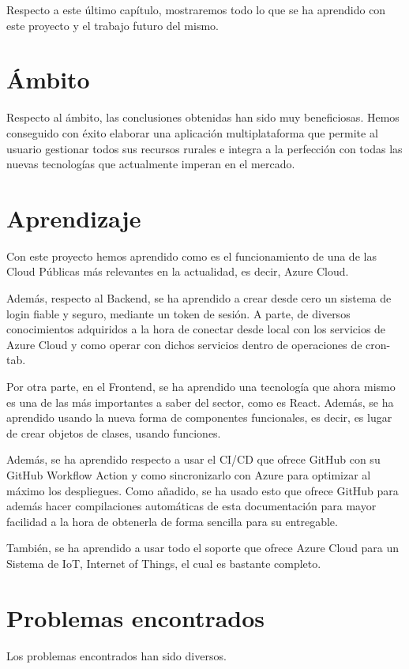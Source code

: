 Respecto a este último capítulo, mostraremos todo lo que se ha aprendido con este proyecto y el trabajo futuro del mismo.

\newpage

\section{Ámbito}
Respecto al ámbito, las conclusiones obtenidas han sido muy beneficiosas. Hemos conseguido con éxito elaborar una aplicación multiplataforma que permite al usuario gestionar todos sus recursos rurales e integra a la perfección con todas las nuevas tecnologías que actualmente imperan en el mercado.

\section{Aprendizaje}
Con este proyecto hemos aprendido como es el funcionamiento de una de las Cloud Públicas más relevantes en la actualidad, es decir, Azure Cloud.

Además, respecto al Backend, se ha aprendido a crear desde cero un sistema de login fiable y seguro, mediante un token de sesión. A parte, de diversos conocimientos adquiridos a la hora de conectar desde local con los servicios de Azure Cloud y como operar con dichos servicios dentro de operaciones de cron-tab.

Por otra parte, en el Frontend, se ha aprendido una tecnología que ahora mismo es una de las más importantes a saber del sector, como es React. Además, se ha aprendido usando la nueva forma de componentes funcionales, es decir, es lugar de crear objetos de clases, usando funciones.

Además, se ha aprendido respecto a usar el CI/CD que ofrece GitHub con su GitHub Workflow Action y como sincronizarlo con Azure para optimizar al máximo los despliegues. Como añadido, se ha usado esto que ofrece GitHub para además hacer compilaciones automáticas de esta documentación para mayor facilidad a la hora de obtenerla de forma sencilla para su entregable.

También, se ha aprendido a usar todo el soporte que ofrece Azure Cloud para un Sistema de IoT, Internet of Things, el cual es bastante completo.

\section{Problemas encontrados}
Los problemas encontrados han sido diversos.

